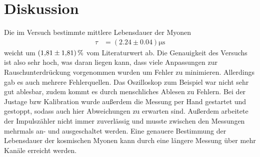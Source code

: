\section{Diskussion}
\label{sec:Diskussion}

Die im Versuch bestimmte mittlere Lebensdauer der Myonen
\begin{align*}
    \tau &= (2.24 \pm 0.04)\si{\micro\second}
\end{align*}
weicht
um $\qty{1.81 \pm 1.81}{\percent}$ vom Literaturwert\cite{PDG} ab.
Die Genauigkeit des Versuchs ist also sehr hoch, was daran liegen kann, dass viele Anpassungen zur Rauschunterdrückung
vorgenommen wurden um Fehler zu minimieren.
Allerdings gab es auch mehrere Fehlerquellen.
Das Oszilloskop zum Beispiel war nicht sehr gut ablesbar, zudem kommt es durch menschliches Ablesen zu Fehlern.
Bei der Justage bzw Kalibration wurde außerdem die Messung per Hand gestartet und gestoppt, sodass auch hier Abweichungen zu erwarten sind.
Außerdem arbeitete der Impulszähler nicht immer zuverlässig und musste zwischen den Messungen mehrmals an- und ausgeschaltet werden.
Eine genauere Bestimmung der Lebensdauer der kosmischen Myonen kann durch eine längere Messung über mehr Kanäle erreicht werden.
